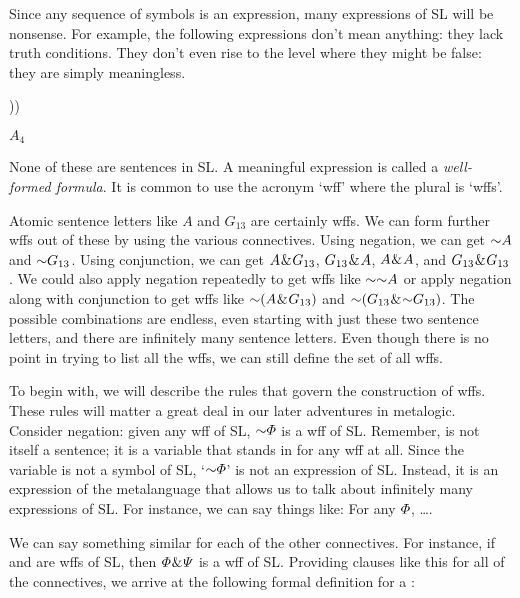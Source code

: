 Since any sequence of symbols is an expression, many expressions of SL will be nonsense. For example, the following expressions don't mean anything: {\color{black}they lack truth conditions. They don't even rise to the level where they might be false: they are simply meaningless.}

\begin{earg}
  \item[] \enot\enot\enot\enot
  \item[] ))\eiff
  \item[] $A_4$ \eor
\end{earg}

None of these are sentences in SL.
A meaningful expression is called a \textit{well-formed formula}.
It is common to use the acronym `wff' where the plural is `wffs'.

Atomic sentence letters like $A$ and $G_{13}$ are certainly wffs.
We can form further wffs out of these by using the various connectives.
Using negation, we can get $\enot A$ and $\enot G_{13}$.
Using conjunction, we can get $A \mkern1mu\&\mkern1mu G_{13}$, $G_{13} \mkern1mu\&\mkern1mu A$, $A \mkern1mu\&\mkern1mu A$, and $G_{13} \mkern1mu\&\mkern1mu G_{13}$.
We could also apply negation repeatedly to get wffs like $\enot \enot A$ or apply negation along with conjunction to get wffs like $\enot(A \eand G_{13})$ and $\enot(G_{13} \eand \enot G_{13})$.
The possible combinations are endless, even starting with just these two sentence letters, and there are infinitely many sentence letters.
Even though there is no point in trying to list all the wffs, we can still define the set of all wffs.

To begin with, we will describe the rules that govern the construction of wffs.
These rules will matter a great deal in our later adventures in metalogic.
Consider negation: given any wff \metaA{} of SL, $\enot\metaA{}$ is a wff of SL.
Remember, \metaA{} is not itself a sentence; it is a variable that stands in for any wff at all.
Since the variable \metaA{} is not a symbol of SL, `$\enot\metaA{}$' is not an expression of SL.
Instead, it is an expression of the metalanguage that allows us to talk about infinitely many expressions of SL.
For instance, we can say things like: For any $\varPhi$, \ldots.

We can say something similar for each of the other connectives.
For instance, if \metaA{} and \metaB{} are wffs of SL, then $\varPhi{}\mkern1mu\&\mkern1mu\varPsi{}$ is a wff of SL.
Providing clauses like this for all of the connectives, we arrive at the following formal definition for a :

